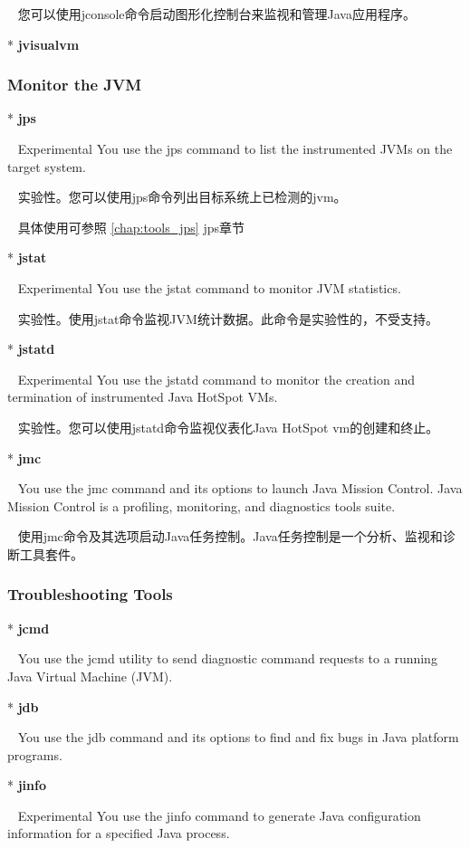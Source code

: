~ 您可以使用jconsole命令启动图形化控制台来监视和管理Java应用程序。

* \textbf{jvisualvm}


\subsubsection{Monitor the JVM}

* \textbf{jps}

~ Experimental You use the jps command to list the instrumented JVMs on the target system.

~ 实验性。您可以使用jps命令列出目标系统上已检测的jvm。

~ 具体使用可参照 \textcolor[rgb]{0,0,1}{\ref{chap:tools_jps}} jps章节

* \textbf{jstat} 

~ Experimental You use the jstat command to monitor JVM statistics. 

~ 实验性。使用jstat命令监视JVM统计数据。此命令是实验性的，不受支持。

* \textbf{jstatd} 

~ Experimental You use the jstatd command to monitor the creation and termination of instrumented Java HotSpot VMs. 

~ 实验性。您可以使用jstatd命令监视仪表化Java HotSpot vm的创建和终止。

* \textbf{jmc} 

~ You use the jmc command and its options to launch Java Mission Control. Java Mission Control is a profiling, monitoring, and diagnostics tools suite.

~ 使用jmc命令及其选项启动Java任务控制。Java任务控制是一个分析、监视和诊断工具套件。        

\subsubsection{Troubleshooting Tools}

* \textbf{jcmd}

~ You use the jcmd utility to send diagnostic command requests to a running Java Virtual Machine (JVM).

* \textbf{jdb}

~ You use the jdb command and its options to find and fix bugs in Java platform programs.

* \textbf{jinfo}

~ Experimental You use the jinfo command to generate Java configuration information for a specified Java process. 

